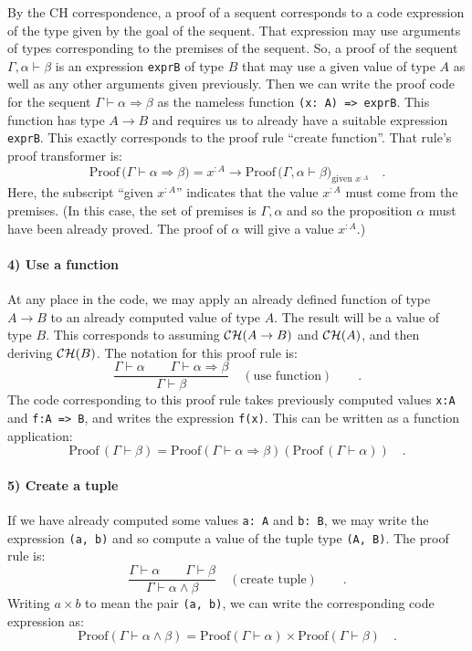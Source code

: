 By the CH correspondence, a proof of a sequent corresponds to a code
expression of the type given by the goal of the sequent. That expression
may use arguments of types corresponding to the premises of the sequent.
So, a proof of the sequent $\Gamma,\alpha\vdash\beta$ is an expression
\lstinline!exprB! of type $B$ that may use a given value of type
$A$ as well as any other arguments given previously. Then we can
write the proof code for the sequent $\Gamma\vdash\alpha\Rightarrow\beta$
as the nameless function \lstinline!(x: A) => exprB!. This function
has type $A\rightarrow B$ and requires us to already have a suitable
expression \lstinline!exprB!. This exactly corresponds to the proof
rule \textsf{``}$\text{create function}$\textsf{''}. That rule\textsf{'}s proof transformer
is:
\[
\text{Proof}\,\big(\Gamma\vdash\alpha\Rightarrow\beta\big)=x^{:A}\rightarrow\text{Proof}\,\big(\Gamma,\alpha\vdash\beta\big)_{\text{given }x^{:A}}\quad.
\]
Here, the subscript \textsf{``}given $x^{:A}$\textsf{''} indicates that the value
$x^{:A}$ must come from the premises. (In this case, the set of premises
is $\Gamma,\alpha$ and so the proposition $\alpha$ must have been
already proved. The proof of $\alpha$ will give a value $x^{:A}$.)

\paragraph{4) Use a function}

At any place in the code, we may apply an already defined function
of type $A\rightarrow B$ to an already computed value of type $A$.
The result will be a value of type $B$. This corresponds to assuming
${\cal CH}(A\rightarrow B)$ and ${\cal CH}(A)$, and then deriving
${\cal CH}(B)$. The notation for this proof rule is:
\[
\frac{\Gamma\vdash\alpha\quad\quad\Gamma\vdash\alpha\Rightarrow\beta}{\Gamma\vdash\beta}\quad(\text{use function})\quad\quad.
\]
The code corresponding to this proof rule takes previously computed
values \lstinline!x:A! and \lstinline!f:A => B!, and writes the
expression \lstinline!f(x)!. This can be written as a function application:
\[
\text{Proof}\,(\Gamma\vdash\beta)=\text{Proof}\left(\Gamma\vdash\alpha\Rightarrow\beta\right)(\text{Proof}\,(\Gamma\vdash\alpha))\quad.
\]


\paragraph{5) Create a tuple}

If we have already computed some values \lstinline!a: A! and \lstinline!b: B!,
we may write the expression \lstinline!(a, b)! and so compute a value
of the tuple type \lstinline!(A, B)!. The proof rule is:
\[
\frac{\Gamma\vdash\alpha\quad\quad\Gamma\vdash\beta}{\Gamma\vdash\alpha\wedge\beta}\quad(\text{create tuple})\quad\quad.
\]
Writing $a\times b$ to mean the pair \lstinline!(a, b)!, we can
write the corresponding code expression as:
\[
\text{Proof}\left(\Gamma\vdash\alpha\wedge\beta\right)=\text{Proof}\left(\Gamma\vdash\alpha\right)\times\text{Proof}\left(\Gamma\vdash\beta\right)\quad.
\]


